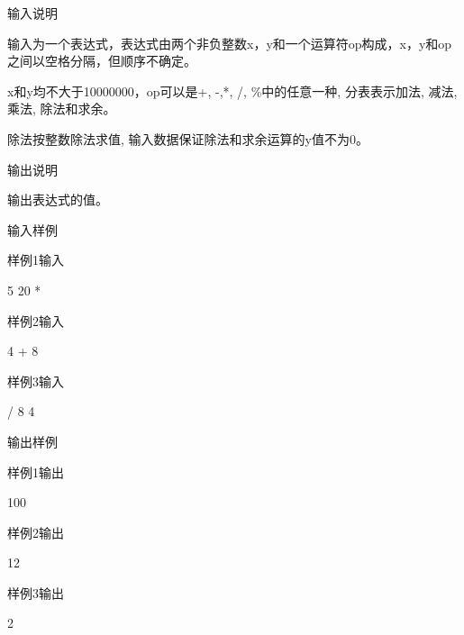 输入说明

输入为一个表达式，表达式由两个非负整数x，y和一个运算符op构成，x，y和op之间以空格分隔，但顺序不确定。

x和y均不大于10000000，op可以是+, -,*, /, \%中的任意一种, 分表表示加法, 减法, 乘法, 除法和求余。

除法按整数除法求值, 输入数据保证除法和求余运算的y值不为0。

输出说明	

输出表达式的值。

输入样例

样例1输入

5 20 *

样例2输入

4 + 8

样例3输入

/ 8 4

输出样例

样例1输出

100

样例2输出

12

样例3输出

2


